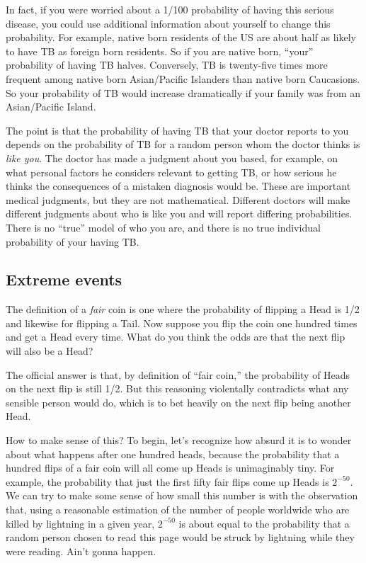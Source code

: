 In fact, if you were worried about a 1/100 probability of having this
serious disease, you could use additional information about yourself
to change this probability.  For example, native born residents of the
US are about half as likely to have TB as foreign born residents.  So
if you are native born, ``your'' probability of having TB halves.
Conversely, TB is twenty-five times more frequent among native born
Asian/Pacific Islanders than native born Caucasions.  So your
probability of TB would increase dramatically if your family was from
an Asian/Pacific Island.

The point is that the probability of having TB that your doctor
reports to you depends on the probability of TB for a random person
whom the doctor thinks is \emph{like you}.  The doctor has made a
judgment about you based, for example, on what personal factors he
considers relevant to getting TB, or how serious he thinks the
consequences of a mistaken diagnosis would be.  These are important
medical judgments, but they are not mathematical.  Different doctors
will make different judgments about who is like you and will report
differing probabilities.  There is no ``true'' model of who you are,
and there is no true individual probability of your having TB.

\subsection{Extreme events}

The definition of a \emph{fair} coin is one where the probability of
flipping a Head is 1/2 and likewise for flipping a Tail.  Now suppose
you flip the coin one hundred times and get a Head every time.  What
do you think the odds are that the next flip will also be a Head?

The official answer is that, by definition of ``fair coin,'' the
probability of Heads on the next flip is still 1/2.  But this
reasoning violentally contradicts what any sensible person would do,
which is to bet heavily on the next flip being another Head.

How to make sense of this?  To begin, let's recognize how absurd it is
to wonder about what happens after one hundred heads, because the
probability that a hundred flips of a fair coin will all come up Heads
is unimaginably tiny.  For example, the probability that just the
first fifty fair flips come up Heads is $2^{-50}$.  We can try to make
some sense of how small this number is with the observation that,
using a reasonable estimation of the number of people worldwide who
are killed by lightning in a given year, $2^{-50}$ is about equal to
the probability that a random person chosen to read this page would be
struck by lightning while they were reading.  Ain't gonna happen.

